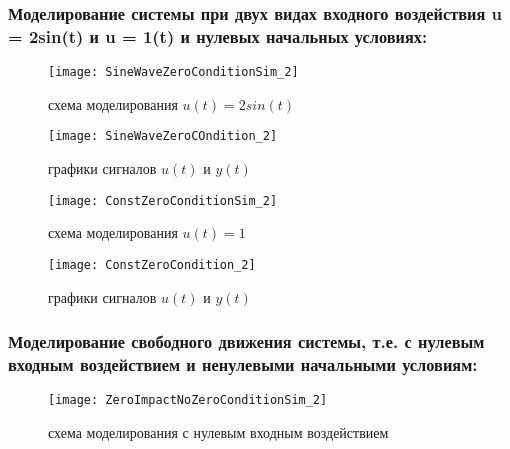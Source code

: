 \subsubsection{Моделирование системы при двух видах входного воздействия u = 2sin(t)  и u = 1(t) и нулевых начальных условиях:}

\begin{figure}[H]
	\begin{center}
		\texttt{[image: SineWaveZeroConditionSim\_2]}
		\caption{схема моделирования $u(t) = 2sin(t)$} 
		\label{pic:pic_7} %
	\end{center}
\end{figure}

\begin{figure}[H]
	\begin{center}
		\texttt{[image: SineWaveZeroCOndition\_2]}
		\caption{графики сигналов $u(t)$ и $y(t)$} 
		\label{pic:pic_8} %
	\end{center}
\end{figure}

\begin{figure}[H]
	\begin{center}
		\texttt{[image: ConstZeroConditionSim\_2]}
		\caption{схема моделирования $u(t) = 1$} 
		\label{pic:pic_9} %
	\end{center}
\end{figure}

\begin{figure}[H]
	\begin{center}
		\texttt{[image: ConstZeroCondition\_2]}
		\caption{графики сигналов $u(t)$ и $y(t)$} 
		\label{pic:pic_10} %
	\end{center}
\end{figure}

\subsubsection{Моделирование свободного движения системы, т.е. с нулевым входным воздействием и ненулевыми начальными условиям:}

\begin{figure}[H]
	\begin{center}
		\texttt{[image: ZeroImpactNoZeroConditionSim\_2]}
		\caption{схема моделирования с нулевым входным воздействием} 
		\label{pic:pic_11} %
	\end{center}
\end{figure}

